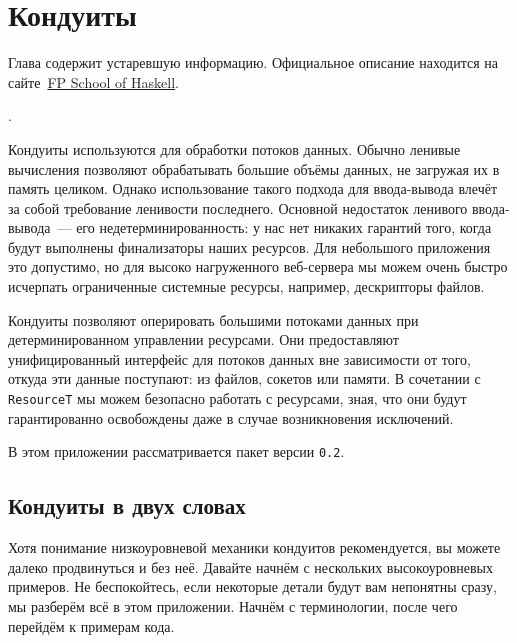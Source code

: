 \chapter{Кондуиты}\label{chap:conduit}

\begin{remark}
    Глава содержит устаревшую информацию. Официальное описание находится на
    сайте~\href{https://www.fpcomplete.com/user/snoyberg/library-documentation/conduit-overview}%
    {FP School of Haskell}\footnotemark.
\end{remark}

.

Кондуиты используются для обработки потоков данных. Обычно ленивые вычисления
позволяют обрабатывать большие объёмы данных, не загружая их в память целиком. Однако
использование такого подхода для ввода-вывода влечёт за собой требование ленивости последнего.
Основной недостаток ленивого ввода-вывода~--- его недетерминированность: у нас нет никаких гарантий того, когда будут выполнены
финализаторы наших ресурсов. Для небольшого приложения это допустимо, но
для высоко нагруженного веб-сервера мы можем очень быстро исчерпать ограниченные системные ресурсы,
например, дескрипторы файлов.

Кондуиты позволяют оперировать большими потоками данных при детерминированном управлении
ресурсами. Они предоставляют унифицированный интерфейс для потоков данных вне зависимости
от того, откуда эти данные поступают: из файлов, сокетов или памяти. В сочетании с \lstinline{ResourceT} мы
можем безопасно работать с ресурсами, зная, что они будут гарантированно освобождены даже
в случае возникновения исключений.

В этом приложении рассматривается пакет
 версии \verb=0.2=.

\section{Кондуиты в двух словах}
Хотя понимание низкоуровневой механики кондуитов рекомендуется, вы можете далеко
продвинуться и без неё. Давайте начнём  с нескольких  высокоуровневых 	 примеров.  Не
беспокойтесь, если некоторые детали будут вам непонятны сразу,
  мы разберём всё в этом приложении. Начнём с терминологии, после чего перейдём к
примерам кода.

